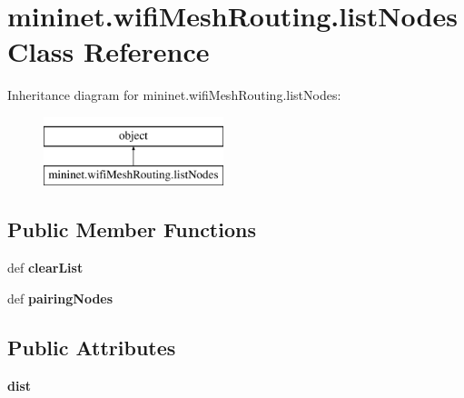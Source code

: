 \hypertarget{classmininet_1_1wifiMeshRouting_1_1listNodes}{\section{mininet.\-wifi\-Mesh\-Routing.\-list\-Nodes Class Reference}
\label{classmininet_1_1wifiMeshRouting_1_1listNodes}
}
Inheritance diagram for mininet.\-wifi\-Mesh\-Routing.\-list\-Nodes\-:\begin{figure}[H]
\begin{center}
\leavevmode
\includegraphics[height=2.000000cm]{classmininet_1_1wifiMeshRouting_1_1listNodes}
\end{center}
\end{figure}
\subsection*{Public Member Functions}
\begin{DoxyCompactItemize}
\item 
\hypertarget{classmininet_1_1wifiMeshRouting_1_1listNodes_a18a31788849ae7900cd38aceafb09e21}{def {\bfseries clear\-List}}\label{classmininet_1_1wifiMeshRouting_1_1listNodes_a18a31788849ae7900cd38aceafb09e21}

\item 
\hypertarget{classmininet_1_1wifiMeshRouting_1_1listNodes_af5acc8dd9646a3e9b458c46abdfd4b7b}{def {\bfseries pairing\-Nodes}}\label{classmininet_1_1wifiMeshRouting_1_1listNodes_af5acc8dd9646a3e9b458c46abdfd4b7b}

\end{DoxyCompactItemize}
\subsection*{Public Attributes}
\begin{DoxyCompactItemize}
\item 
\hypertarget{classmininet_1_1wifiMeshRouting_1_1listNodes_ae811550881969587c24accbaa8652126}{{\bfseries dist}}\label{classmininet_1_1wifiMeshRouting_1_1listNodes_ae811550881969587c24accbaa8652126}

\end{DoxyCompactItemize}
